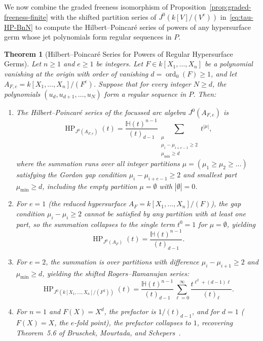 \documentclass[a4paper, 12pt]{amsart}
\newtheorem{theorem}{Theorem}[section]
\theoremstyle{remark}
\begin{document}
We now combine the graded freeness isomorphism of Proposition~\ref{prop:graded-freeness-finite}
with the shifted partition series of $J^0(k[V]/(V^e))$ in~\eqref{eq:tau-HP-BnN}
to compute the Hilbert--Poincaré series of powers of any hypersurface germ whose jet polynomials form regular sequences in $P$.

\begin{theorem}[Hilbert--Poincaré Series for Powers of Regular Hypersurface Germs]
\label{thm:general-regular-germs}
Let $n \ge 1$ and $e \ge 1$ be integers.
Let $F \in k[X_1, \dots, X_n]$ be a polynomial vanishing at the origin with order of vanishing $d = \operatorname{ord}_0(F) \ge 1$,
and let $A_{F, e} = k[X_1, \dots, X_n] / (F^e)$.
Suppose that for every integer $N \ge d$,
the polynomials $(u_d, u_{d + 1}, \dots, u_N)$ form a regular sequence in $P$.
Then:
\begin{enumerate}
  \item The Hilbert--Poincaré series of the focussed arc algebra $J^0(A_{F, e})$ is
  \begin{equation}
    \label{eq:HP-general-regular}
    \operatorname{HP}_{J^0(A_{F, e})}(t) = \frac{\mathbb{H}(t)^{n - 1}}{(t)_{d - 1}} \sum_{\substack{\mu \\ \mu_i - \mu_{i + e - 1} \ge 2 \\ \mu_{\mathrm{min}} \ge d}} t^{|\mu|},
  \end{equation}
  where the summation runs over all integer partitions $\mu = (\mu_1 \ge \mu_2 \ge \dots)$ satisfying the Gordon gap condition $\mu_i - \mu_{i + e - 1} \ge 2$ and smallest part $\mu_{\mathrm{min}} \ge d$,
  including the empty partition $\mu = \emptyset$ with $|\emptyset| = 0$.
  \item For $e = 1$ (the reduced hypersurface $A_F = k[X_1, \dots, X_n] / (F)$),
  the gap condition $\mu_i - \mu_i \ge 2$ cannot be satisfied by any partition with at least one part,
  so the summation collapses to the single term $t^0 = 1$ for $\mu = \emptyset$,
  yielding
  \begin{equation}
    \label{eq:HP-general-n1}
    \operatorname{HP}_{J^0(A_F)}(t) = \frac{\mathbb{H}(t)^{n - 1}}{(t)_{d - 1}}.
  \end{equation}
  \item For $e = 2$,
  the summation is over partitions with difference $\mu_i - \mu_{i + 1} \ge 2$ and $\mu_{\mathrm{min}} \ge d$,
  yielding the shifted Rogers--Ramanujan series:
  \begin{equation}
    \label{eq:HP-general-n2}
    \operatorname{HP}_{J^0(k[X_1, \dots, X_n] / (F^2))}(t) = \frac{\mathbb{H}(t)^{n - 1}}{(t)_{d - 1}} \sum_{\ell = 0}^\infty \frac{t^{\ell^2 + (d - 1)\ell}}{(t)_\ell}.
  \end{equation}
  \item For $n = 1$ and $F(X) = X^d$,
  the prefactor is $1 / (t)_{d - 1}$,
  and for $d = 1$ ($F(X) = X$, the $e$-fold point),
  the prefactor collapses to $1$,
  recovering Theorem~5.6 of Bruschek, Mourtada, and Schepers~\cite{bruschek_arc_2013}.
\end{enumerate}
\end{theorem}
\end{document}
